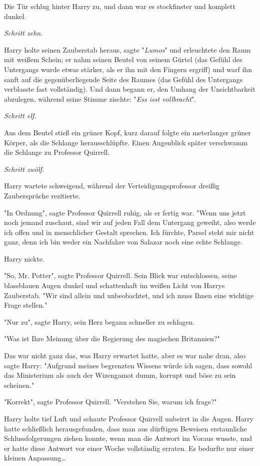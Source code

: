 {Die Tür schlug hinter Harry zu, und dann war es stockfinster und komplett dunkel.

\emph{\emph{Schritt zehn.}}

Harry holte seinen Zauberstab heraus, sagte "\emph{Lumos}" und erleuchtete den Raum mit weißem Schein; er nahm seinen Beutel von seinem Gürtel (das Gefühl des Untergangs wurde etwas stärker, als er ihn mit den Fingern ergriff) und warf ihn sanft auf die gegenüberliegende Seite des Raumes (das Gefühl des Untergangs verblasste fast vollständig). Und dann begann er, den Umhang der Unsichtbarkeit abzulegen, während seine Stimme zischte: "\emph{Ess isst vollbracht}".

\emph{\emph{Schritt elf.}}

Aus dem Beutel stieß ein grüner Kopf, kurz darauf folgte ein meterlanger grüner Körper, als die Schlange herausschlüpfte. Einen Augenblick später verschwamm die Schlange zu Professor Quirrell.

\emph{\emph{Schritt zwölf.}}

Harry wartete schweigend, während der Verteidigungsprofessor dreißig Zaubersprüche rezitierte.

"In Ordnung", sagte Professor Quirrell ruhig, als er fertig war. "Wenn uns jetzt noch jemand zuschaut, sind wir auf jeden Fall dem Untergang geweiht, also werde ich offen und in menschlicher Gestalt sprechen. Ich fürchte, Parsel steht mir nicht ganz, denn ich bin weder ein Nachfahre von Salazar noch eine echte Schlange.

Harry nickte.

"So, Mr. Potter", sagte Professor Quirrell. Sein Blick war entschlossen, seine blassblauen Augen dunkel und schattenhaft im weißen Licht von Harrys Zauberstab. "Wir sind allein und unbeobachtet, und ich muss Ihnen eine wichtige Frage stellen."

"Nur zu", sagte Harry, sein Herz begann schneller zu schlagen.

"Was ist Ihre Meinung über die Regierung des magischen Britannien?"

Das war nicht ganz das, was Harry erwartet hatte, aber es war nahe dran, also sagte Harry: "Aufgrund meines begrenzten Wissens würde ich sagen, dass sowohl das Ministerium als auch der Wizengamot dumm, korrupt und böse zu sein scheinen."

"Korrekt", sagte Professor Quirrell. "Verstehen Sie, warum ich frage?"

Harry holte tief Luft und schaute Professor Quirrell unbeirrt in die Augen. Harry hatte schließlich herausgefunden, dass man aus dürftigen Beweisen erstaunliche Schlussfolgerungen ziehen konnte, wenn man die Antwort im Voraus wusste, und er hatte diese Antwort vor einer Woche vollständig erraten. Es bedurfte nur einer kleinen Anpassung…

}
